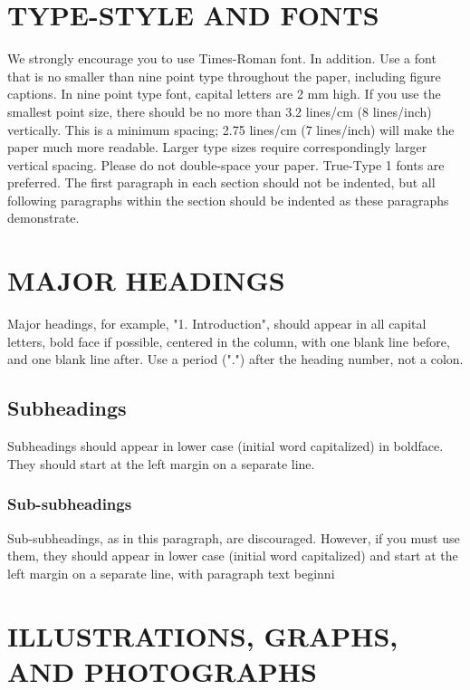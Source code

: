 \documentclass{article}
\begin{document}
\section{TYPE-STYLE AND FONTS}
\label{sec:typestyle}

We strongly encourage you to use Times-Roman font.  In addition. Use a font that is no smaller than nine point type throughout the paper, including figure captions.
In nine point type font, capital letters are 2 mm high.  If you use the smallest point size, there should be no more than 3.2 lines/cm (8 lines/inch) vertically.  This is a minimum spacing; 2.75 lines/cm (7 lines/inch) will make the paper much more readable.  Larger type sizes require correspondingly larger vertical spacing.  Please do not double-space your paper.  True-Type 1 fonts are preferred.
The first paragraph in each section should not be indented, but all following paragraphs within the section should be indented as these paragraphs demonstrate.


\section{MAJOR HEADINGS}
\label{sec:majhead}

Major headings, for example, "1. Introduction", should appear in all capital
letters, bold face if possible, centered in the column, with one blank line
before, and one blank line after. Use a period (".") after the heading number,
not a colon.

\subsection{Subheadings}
\label{ssec:subhead}

Subheadings should appear in lower case (initial word capitalized) in
boldface.  They should start at the left margin on a separate line.

\subsubsection{Sub-subheadings}
\label{sssec:subsubhead}

Sub-subheadings, as in this paragraph, are discouraged. However, if you
must use them, they should appear in lower case (initial word
capitalized) and start at the left margin on a separate line, with paragraph
text beginni

\section{ILLUSTRATIONS, GRAPHS, AND PHOTOGRAPHS}
\label{sec:illust}
\end{document}
